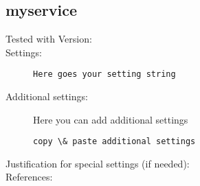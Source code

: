 \subsection{myservice}


\begin{description}
\item[Tested with Version:]

\item[Settings:] \mbox{}

\begin{lstlisting}[breaklines]
	Here goes your setting string
\end{lstlisting}

\item[Additional settings:]

Here you can add additional settings 

\begin{lstlisting}[breaklines]
	copy \& paste additional settings
\end{lstlisting}

\item[Justification for special settings (if needed):]

\item[References:]

\end{description}

